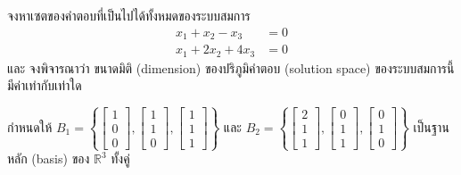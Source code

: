 ﻿\documentclass[12pt, a4paper]{exam}
\begin{document}
\begin{questions}
\question จงหาเซตของคำตอบที่เป็นไปได้ทั้งหมดของระบบสมการ
\[
\begin{aligned}
x_1 + x_2 - x_3 &= 0 \\
x_1 + 2x_2 + 4x_3 &= 0
\end{aligned}
\]
และ จงพิจารณาว่า ขนาดมิติ (dimension) ของปริภูมิคำตอบ (solution space) ของระบบสมการนี้มีค่าเท่ากับเท่าใด

\question กำหนดให้ $B_1 = \left\{ \begin{bmatrix} 1 \\ 0 \\ 0 \end{bmatrix}, \begin{bmatrix} 1 \\ 1 \\ 0 \end{bmatrix}, \begin{bmatrix} 1 \\ 1 \\ 1 \end{bmatrix} \right\}$ และ $B_2 = \left\{ \begin{bmatrix} 2 \\ 1 \\ 1 \end{bmatrix}, \begin{bmatrix} 0 \\ 1 \\ 1 \end{bmatrix}, \begin{bmatrix} 0 \\ 1 \\ 0 \end{bmatrix} \right\}$ เป็นฐานหลัก (basis) ของ $\mathbb{R}^3$ ทั้งคู่
\end{questions}
\end{document}
